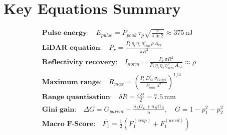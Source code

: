 \documentclass[12pt,a4paper]{article}
\begin{document}
\section{Key Equations Summary}

\begin{align}
    &\textbf{Pulse energy:}\quad
    E_{pulse} = P_{peak}\,\tau_p\sqrt{\tfrac{\pi}{4\ln 2}} \approx 375\,\text{nJ}
    \tag{A.1} \\[4pt]
    &\textbf{LiDAR equation:}\quad
    P_r = \frac{P_t\,\eta_t\,\eta_r\,\eta_{atm}^2\,\rho\,A_{rx}}{\pi R^2}
    \tag{A.2} \\[4pt]
    &\textbf{Reflectivity recovery:}\quad
    I_{norm} = \frac{P_r\,\pi R^2}{P_t\,\eta_t\,\eta_r\,\eta_{atm}^2\,A_{rx}}\approx\rho
    \tag{A.3} \\[4pt]
    &\textbf{Maximum range:}\quad
    R_{max} = \!\left(\frac{P_t\,D_{rx}^2\,\sigma_{target}}{P_{min}\,\lambda^2}\right)^{1/4}
    \tag{A.4} \\[4pt]
    &\textbf{Range quantisation:}\quad
    \delta R = \frac{c\,\delta t}{2} = 7.5\,\text{mm}
    \tag{A.5} \\[4pt]
    &\textbf{Gini gain:}\quad
    \Delta G = G_{parent} - \frac{n_L G_L + n_R G_R}{n},\quad G = 1-p_1^2-p_2^2
    \tag{A.6} \\[4pt]
    &\textbf{Macro F-Score:}\quad
    \overline{F_1} = \tfrac{1}{2}\!\left(F_1^{(crop)}+F_1^{(weed)}\right)
    \tag{A.7}
\end{align}

\end{document}
